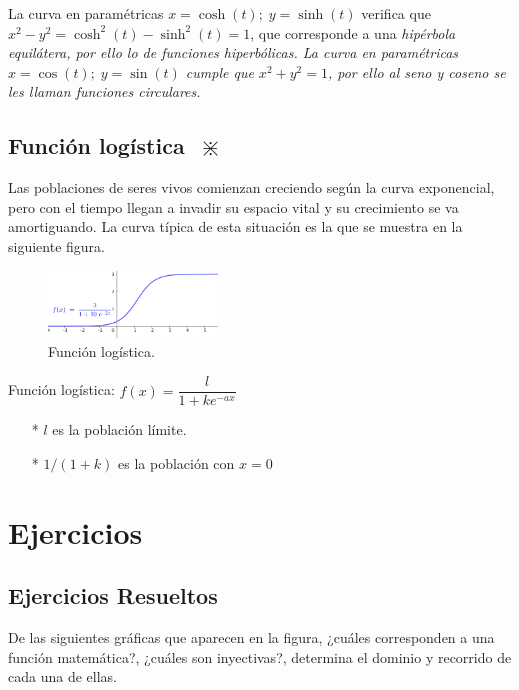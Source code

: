 		 \small{La curva en paramétricas $x=\cosh (t);\; y=\sinh(t)$ verifica que $x^2-y^2=\cosh^2 (t)-\sinh^2(t)=1$, que corresponde a una \emph{hipérbola equilátera, por ello lo de funciones hiperbólicas. La curva en paramétricas $x=\cos (t);\; y=\sin(t)$  cumple que $x^2+y^2=1$, por ello al seno y coseno se les llaman funciones circulares.}
		
		
		\subsection{Función logí­stica  $\; \divideontimes$}
		
		Las poblaciones de seres vivos comienzan creciendo según la curva exponencial, pero con el tiempo llegan a invadir su espacio vital y su crecimiento se va amortiguando. La curva tí­pica de esta situación es la que se muestra en la siguiente figura.
		
		\begin{figure}[H]
			\centering
			\includegraphics[width=0.4\textwidth]{imagenes/imagenes02/T02IM15.png}
			\caption{Función logí­stica.}
		\end{figure}
		
		 Función logí­stica: $f(x)=\dfrac {l}{1+ke^{-ax}}$
		
		\begin{itemize}
			\item [*] $l$ es la población lí­mite.
			\item [*] $1/(1+k)$ es la población con $x=0$
		\end{itemize}
		
		
		\section{Ejercicios}
		
		\subsection{Ejercicios Resueltos}
		
		\begin{ejre}
			De las siguientes gráficas que aparecen en la figura, ¿cuáles corresponden a una función matemática?, ¿cuáles son inyectivas?, determina el dominio y recorrido de cada una de ellas.
		\end{ejre}
		
}

